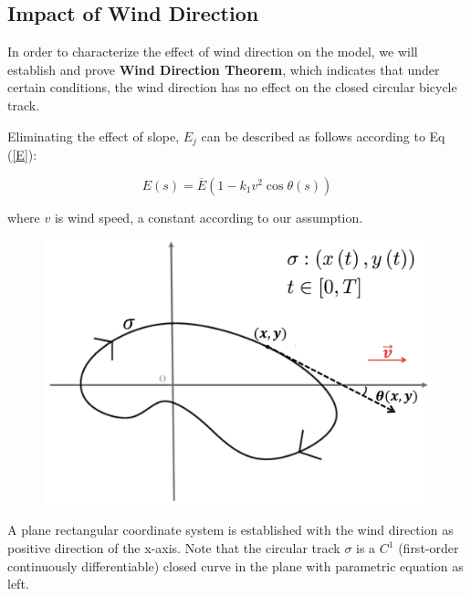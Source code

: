 \subsection{Impact of Wind Direction}

\par In order to characterize the effect of wind direction on the model, we will establish and prove {\bf Wind Direction Theorem}, which indicates that under certain conditions, the wind direction has no effect on the closed circular bicycle track. 

\par Eliminating the effect of slope, $E_j$ can be described as follows according to Eq (\ref{E}):

\begin{equation}
	E(s) = \overline{E}(1-k_1v^2\cos\theta(s))
\end{equation}
\begin{flushleft}
\par where $v$ is wind speed, a constant according to our assumption.
\end{flushleft}

\begin{figure} 
	\includegraphics[width=0.7\linewidth]{image/fig3}
	\label{fig3}
\end{figure}

 \par A plane rectangular coordinate system is established with the wind direction as positive direction of the x-axis. Note that the circular track $\sigma$ is a $C^1$ (first-order continuously differentiable) closed curve in the plane with parametric equation as left.

